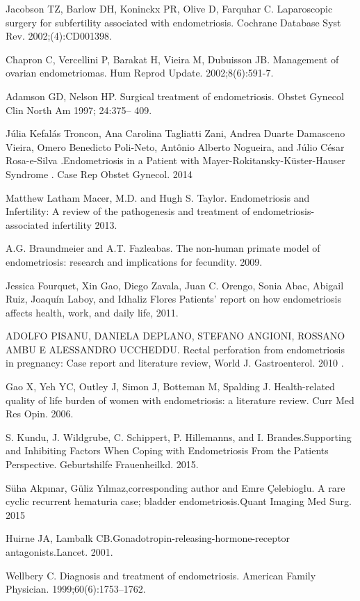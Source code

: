 \documentclass[12pt]{article} %
\begin{document}
Jacobson TZ, Barlow DH, Koninckx PR, Olive D, Farquhar C. Laparoscopic surgery for subfertility associated with endometriosis. Cochrane Database Syst Rev. 2002;(4):CD001398.


Chapron C, Vercellini P, Barakat H, Vieira M, Dubuisson JB. Management of ovarian endometriomas. Hum Reprod Update. 2002;8(6):591-7.

Adamson GD, Nelson HP. Surgical treatment of endometriosis. Obstet Gynecol Clin North Am 1997; 24:375– 409.



Júlia Kefalás Troncon, Ana Carolina Tagliatti Zani, Andrea Duarte Damasceno Vieira, Omero Benedicto Poli-Neto, Antônio Alberto Nogueira, and Júlio César Rosa-e-Silva .Endometriosis in a Patient with Mayer-Rokitansky-Küster-Hauser Syndrome . Case Rep Obstet Gynecol. 2014

Matthew Latham Macer, M.D. and Hugh S. Taylor. Endometriosis and Infertility: A review of the pathogenesis and treatment of endometriosis-associated infertility 2013.

A.G. Braundmeier and A.T. Fazleabas. The non-human primate model of endometriosis: research and implications for fecundity. 2009.

Jessica Fourquet, Xin Gao, Diego Zavala, Juan C. Orengo, Sonia Abac, Abigail Ruiz, Joaquín Laboy, and Idhaliz Flores Patients’ report on how endometriosis affects health, work, and daily life, 2011.


ADOLFO PISANU, DANIELA DEPLANO, STEFANO ANGIONI, ROSSANO AMBU E ALESSANDRO UCCHEDDU. Rectal perforation from endometriosis in pregnancy: Case report and literature review, World J. Gastroenterol. 2010 .

Gao X, Yeh YC, Outley J, Simon J, Botteman M, Spalding J. Health-related quality of life burden of women with endometriosis: a literature review. Curr Med Res Opin. 2006.

S. Kundu, J. Wildgrube, C. Schippert, P. Hillemanns, and I. Brandes.Supporting and Inhibiting Factors When Coping with Endometriosis From the Patients Perspective. Geburtshilfe Frauenheilkd. 2015.

Süha Akpınar, Güliz Yılmaz,corresponding author and Emre Çelebioglu. A rare cyclic recurrent hematuria case; bladder endometriosis.Quant Imaging Med Surg. 2015 

Huirne JA, Lambalk CB.Gonadotropin-releasing-hormone-receptor antagonists.Lancet. 2001.

Wellbery C. Diagnosis and treatment of endometriosis. American Family Physician. 1999;60(6):1753–1762.
\end{document}
